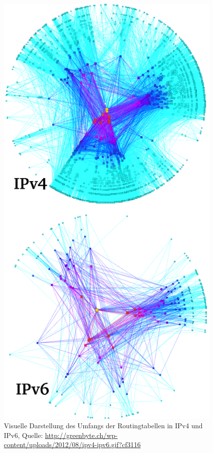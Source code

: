 \documentclass[a4paper,12pt]{scrartcl}
\begin{document}
\begin{figure}[htb]
\begin{center}
 \includegraphics[width=.7\hsize]{./images/ipv4v6map.png}
 \end{center}
\caption[Visuelle Darstellung des Umfangs der Routingtabellen in IPv4 und IPv6, Quelle: \url{http://greenbyte.ch/wp-content/uploads/2012/08/ipv4-ipv6.gif?cf3116}]{\label{ipv4v6map}Visuelle Darstellung des Umfangs der Routingtabellen in IPv4 und IPv6, Quelle: \url{http://greenbyte.ch/wp-content/uploads/2012/08/ipv4-ipv6.gif?cf3116}}
\end{figure}

\clearpage
\end{document}
